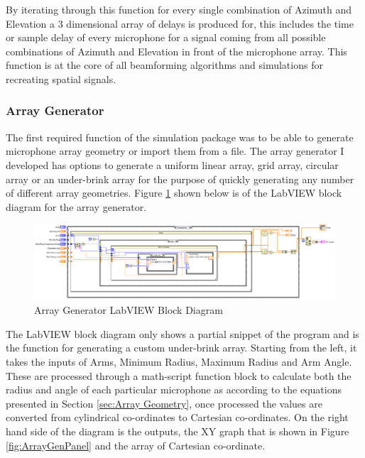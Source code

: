\documentclass{UoNMCHA}
\numberwithin{equation}{section}
\begin{document}
    By iterating through this function for every single combination of Azimuth and Elevation a 3 dimensional array of delays is produced for, this includes the time or sample delay of every microphone for a signal coming from all possible combinations of Azimuth and Elevation in front of the microphone array. This function is at the core of all beamforming algorithms and simulations for recreating spatial signals.
    
\subsubsection{Array Generator} \label{sec:Array Generator}
    The first required function of the simulation package was to be able to generate microphone array geometry or import them from a file. The array generator I developed has options to generate a uniform linear array, grid array, circular array or an under-brink array for the purpose of quickly generating any number of different array geometries. Figure \ref{fig:ArrayGenBlock} shown below is of the LabVIEW block diagram for the array generator.
    
    \begin{figure}[H]
        \centering
        \includegraphics[keepaspectratio, width = \textwidth]{Figures/ArrayGenBlock.png}
        \caption{Array Generator LabVIEW Block Diagram}
        \label{fig:ArrayGenBlock}
    \end{figure}
    
    The LabVIEW block diagram only shows a partial snippet of the program and is the function for generating a custom under-brink array. Starting from the left, it takes the inputs of Arms, Minimum Radius, Maximum Radius and Arm Angle. These are processed through a math-script function block to calculate both the radius and angle of each particular microphone as according to the equations presented in Section \ref{sec:Array Geometry}, once processed the values are converted from cylindrical co-ordinates to Cartesian co-ordinates. On the right hand side of the diagram is the outputs, the XY graph that is shown in Figure \ref{fig:ArrayGenPanel} and the array of Cartesian co-ordinate.
    
\end{document}
